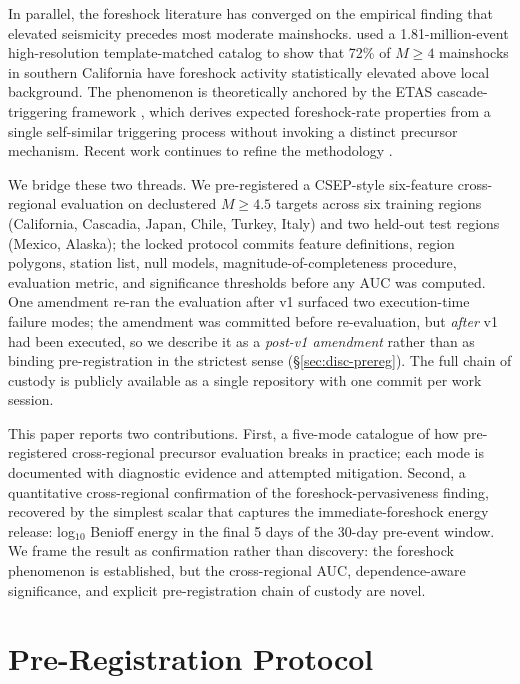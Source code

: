 \documentclass[11pt]{article}
\begin{document}
In parallel, the foreshock literature has converged on the empirical
finding that elevated seismicity precedes most moderate mainshocks.
\citet{trugman2019} used a 1.81-million-event high-resolution
template-matched catalog to show that 72\% of $M{\ge}4$ mainshocks in
southern California have foreshock activity statistically elevated
above local background. The phenomenon is theoretically anchored by
the ETAS cascade-triggering framework
\citep{helmstetter2003a, helmstetter2003b}, which derives expected
foreshock-rate properties from a single self-similar triggering process
without invoking a distinct precursor mechanism. Recent work continues
to refine the methodology \citep{lippiello2025, khan2025, moutote2021}.

We bridge these two threads. We pre-registered a CSEP-style six-feature
cross-regional evaluation on declustered $M{\ge}4.5$ targets across six
training regions (California, Cascadia, Japan, Chile, Turkey, Italy)
and two held-out test regions (Mexico, Alaska); the locked protocol
\citep{loftus2026prereg} commits feature definitions, region polygons,
station list, null models, magnitude-of-completeness procedure,
evaluation metric, and significance thresholds before any AUC was
computed. One amendment \citep{loftus2026pra2} re-ran the evaluation
after v1 surfaced two execution-time failure modes; the amendment was
committed before re-evaluation, but \emph{after} v1 had been executed,
so we describe it as a \emph{post-v1 amendment} rather than as binding
pre-registration in the strictest sense (\S\ref{sec:disc-prereg}). The
full chain of custody is publicly available as a single repository with
one commit per work session.

This paper reports two contributions. First, a five-mode catalogue of
how pre-registered cross-regional precursor evaluation breaks in
practice; each mode is documented with diagnostic evidence and
attempted mitigation. Second, a quantitative cross-regional confirmation
of the \citet{trugman2019} foreshock-pervasiveness finding, recovered
by the simplest scalar that captures the immediate-foreshock energy
release: log$_{10}$ Benioff energy in the final 5 days of the 30-day
pre-event window. We frame the result as confirmation rather than
discovery: the foreshock phenomenon is established, but the
cross-regional AUC, dependence-aware significance, and explicit
pre-registration chain of custody are novel.

\section{Pre-Registration Protocol}
\label{sec:prereg}
\end{document}
